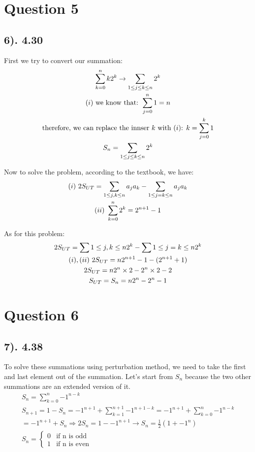 \documentclass[12pt]{article}
\newcommand{\RNum}[1]{\uppercase\expandafter{\romannumeral #1\relax}}
\begin{document}
\section*{Question 5}
\subsection*{6). 4.30}
First we try to convert our summation:
\begin{gather*}
    \sum_{k=0}^n k2^k \to \sum_{1 \leq j \leq k \leq n } 2^k \\
    \text{($\RNum{1}$) we know that: } \sum_{j=0}^n 1 = n \\
    \text{therefore, we can replace the innser $k$ with ($\RNum{1}$): } k = \sum_{j=0}^k 1 \\
    S_{n} = \sum_{1 \leq j \leq k \leq n} 2^k
\end{gather*}

Now to solve the problem, according to the textbook, we have:
\begin{gather*}
    \text{$(\RNum{1})$ } 2S_{UT} = \sum_{1 \leq j,k \leq n} a_{j}a_{k} - \sum_{1 \leq j=k \leq n} a_{j}a_{k} \\
    \text{$(\RNum{2})$ } \sum_{k=0}^n 2^k = 2^{n+1} - 1
\end{gather*}

As for this problem:
\begin{gather*}
    2S_{UT} = \sum{1 \leq j,k \leq n} 2^k - \sum{1 \leq j=k \leq n} 2^k \\
    \text{$(\RNum{1}), (\RNum{2})$ } 2S_{UT} = n2^{n+1} - 1 - (2^{n+1} + 1) \\
    2S_{UT} = n2^{n} \times 2 - 2^n \times 2 - 2 \\
    S_{UT} = S_{n} = n2^{n} - 2^n - 1 
\end{gather*}

\section*{Question 6}
\subsection*{7). 4.38}
To solve these summations using perturbation method, we need to take the first and last element out of the summation. Let's start from
$S_{n}$ because the two other summations are an extended version of it.
\begin{gather*}
    S_{n} = \sum_{k=0}^n {-1}^{n-k} \\
    S_{n+1} = 1 - S_{n} = {-1}^{n+1} + \sum_{k=1}^{n+1} {-1}^{n+1-k} = {-1}^{n+1} + \sum_{k=0}^n {-1}^{n-k} \\
    = {-1}^{n+1} + S_{n} \Rightarrow 2S_{n} = 1 - {-1}^{n+1} \to S_{n} = \frac{1}{2} (1 + {-1}^n) \\
    S_{n} = \begin{cases} 0 & \text{if n is odd} \\ 1 & \text{if n is even} \end{cases}
\end{gather*}
\end{document}
